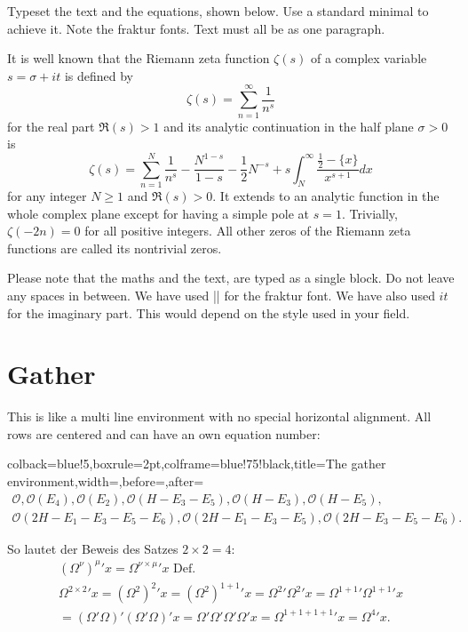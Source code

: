 {\begin{casestudy}{%
Typeset the text and the equations, shown below. Use a standard minimal to achieve it. Note the fraktur fonts. Text must all be as one paragraph.}
\begin{teX}
It is well known that the Riemann zeta function $\zeta(s)$ of a complex variable $s=\sigma+it$ is defined by
\[
\zeta(s)=\sum_{n=1}^{\infty}\frac{1}{n^{s}}
\]
for the real part $\mathfrak{R}(s)>1$ and its analytic continuation in the half plane $\sigma>0$ is
\begin{equation}\label{func:zeta}
\zeta(s)=\sum_{n=1}^{N}\frac{1}{n^{s}}-\frac{N^{1-s}}{1-s}-\frac{1}{2}N^{-s}
+s\int_{N}^{\infty}\frac{\frac{1}{2}-\{x\}}{x^{s+1}}dx
\end{equation}
for any integer $N\geq1$ and $\mathfrak{R}(s)>0$.
It extends to an analytic function in the whole complex plane except for having a simple pole at $s=1$. Trivially, $\zeta(-2n)=0$ for all positive integers. All other zeros of the Riemann zeta functions are called its nontrivial zeros.
\end{teX}

Please note that the maths and the text, are typed as a single block. Do not leave any spaces in between. We have used |\mathfrak| for the fraktur font. We have also used $it$ for the imaginary part. This would depend on the style used in your field. 
\end{casestudy}

\clearpage
\section{Gather}
This is like a multi line environment with no special horizontal alignment. All rows
are centered and can have an own equation number:

\begin{tcblisting}{colback=blue!5,boxrule=2pt,colframe=blue!75!black,title=The gather environment,width=\textwidth,before=\bigskip,after=\bigskip}
\def\O{\mathcal{O}}
\begin{gather}
 \O,\O(E_4),\O(E_2),\O(H-E_3-E_5),\O(H-E_3),\O(H-E_5),\\ 
\O(2H-E_1-E_3-E_5-E_6),\O(2H-E_1-E_3-E_5),\O(2H-E_3-E_5-E_6).
\end{gather}

So lautet der Beweis des Satzes $2 \times 2 = 4$:
\begin{gather}
(\Omega^{\nu})^{\mu}{}'x = \Omega^{\nu \times \mu}{}'x \text{ Def.}\\
\Omega^{2 \times 2}{}'x = (\Omega^{2})^{2}{}'x = (\Omega^{2})^{1 + 1}{}'x = \Omega^{2}{}'\Omega^{2}{}'x = \Omega^{1 + 1}{}'\Omega^{1 + 1}{}'x\nonumber \\
= (\Omega'\Omega)'(\Omega'\Omega)'x = \Omega'\Omega'\Omega'\Omega'x = \Omega^{1 + 1 + 1 + 1}{}'x = \Omega^{4}{}'x.
\end{gather}



\end{tcblisting}}
